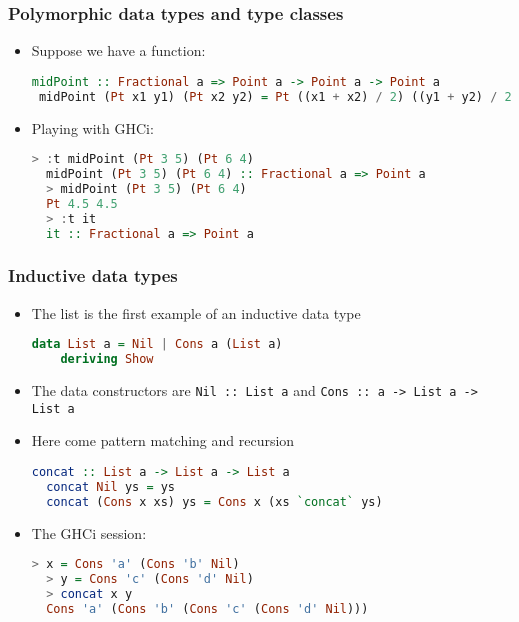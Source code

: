 \documentclass[10pt,pdf,utf8,russian,aspectratio=169]{beamer}
\begin{document}
\begin{frame}[fragile]
  \frametitle{Polymorphic data types and type classes}

\begin{itemize}
  \item Suppose we have a function:

  \begin{lstlisting}[language=Haskell]
 midPoint :: Fractional a => Point a -> Point a -> Point a
 midPoint (Pt x1 y1) (Pt x2 y2) = Pt ((x1 + x2) / 2) ((y1 + y2) / 2)
  \end{lstlisting}
  \item Playing with GHCi:
  \begin{lstlisting}[language=Haskell]
  > :t midPoint (Pt 3 5) (Pt 6 4)
  midPoint (Pt 3 5) (Pt 6 4) :: Fractional a => Point a
  > midPoint (Pt 3 5) (Pt 6 4)
  Pt 4.5 4.5
  > :t it
  it :: Fractional a => Point a
  \end{lstlisting}
\end{itemize}
\end{frame}

\begin{frame}[fragile]
  \frametitle{Inductive data types}

\begin{itemize}
  \item The list is the first example of an inductive data type

  \begin{lstlisting}[language=Haskell]
  data List a = Nil | Cons a (List a)
    deriving Show
  \end{lstlisting}
  \item The data constructors are \verb"Nil :: List a" and \verb"Cons :: a -> List a -> List a"
  \item Here come pattern matching and recursion
  \begin{lstlisting}[language=Haskell]
  concat :: List a -> List a -> List a
  concat Nil ys = ys
  concat (Cons x xs) ys = Cons x (xs `concat` ys)
  \end{lstlisting}
  \item The GHCi session:
  \begin{lstlisting}[language=Haskell]
  > x = Cons 'a' (Cons 'b' Nil)
  > y = Cons 'c' (Cons 'd' Nil)
  > concat x y
  Cons 'a' (Cons 'b' (Cons 'c' (Cons 'd' Nil)))
  \end{lstlisting}
\end{itemize}
\end{frame}
\end{document}
